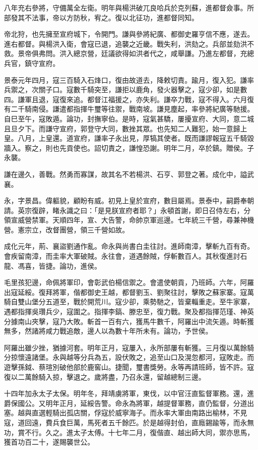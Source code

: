 \begin{pinyinscope}
八年充右參將，守備萬全左衛。明年與楊洪破兀良哈兵於克列蘇，進都督僉事。所部發其不法事，帝以方防秋，宥之。復以北征功，進都督同知。

帝北狩，也先擁至宣府城下，令開門。謙與參將紀廣、都御史羅亨信不應，遂去。進右都督。與楊洪入衛，會寇已退，追襲之近畿。戰失利，洪劾之。兵部並劾洪不救。景帝俱弗問。洪入總京營，廷議欲得如洪者代之，咸舉謙。乃進左都督，充總兵官，鎮守宣府。

景泰元年四月，寇三百騎入石烽口，復由故道去，降敕切責。踰月，復入犯。謙率兵禦之，次關子口。寇數千騎突至，謙拒以鹿角，發火器擊之，寇少卻，如是數四。謙軍且退，寇復來追。都督江福援之，亦失利。謙卒力戰，寇不得入。六月復有二千騎南侵。謙遣都指揮牛璽等往禦，戰南坡。謙見塵起，率參將紀廣等馳援。自巳至午，寇敗遁。論功，封撫寧伯。是時，寇氣甚驕，屢擾宣府、大同，意二城且旦夕下。而謙守宣府，郭登守大同，數挫其眾。也先知二人難犯，始一意歸上皇。八月，上皇還。道宣府，謙率子永出見，厚犒其使者。既而謙謬報寇五千騎毀牆入。察之，則也先貢使也。詔切責之，謙惶恐謝。明年二月，卒於鎮。贈侯。子永襲。

謙在邊久，善戰。然勇而寡謀，故其名不若楊洪、石亨、郭登之著。成化中，謚武襄。

永，字景昌。偉軀貌，顧盼有威。初見上皇於宣府，數目屬焉。景泰中，嗣爵奉朝請。英宗復辟，睹永識之曰：「是見朕宣府者耶？」永頓首謝，即日召侍左右，分領宣威營禁軍。天順四年，宣、大告警，命帥京軍巡邊。七年統三千營，尋兼神機營。憲宗立，改督團營，領三千營如故。

成化元年，荊、襄盜劉通作亂。命永與尚書白圭往討。進師南漳，擊斬九百有奇。會疾留南漳，而圭率大軍破賊。永往會，道遇餘賊，俘斬數百人。其秋復進討石龍、馮喜，皆捷。論功，進侯。

毛里孩犯邊，命佩將軍印，會彰武伯楊信禦之。會遣使朝貢，乃班師。六年，阿羅出寇延綏。復拜將軍，偕都御史王越，都督劉玉、劉聚往討，擊敗之蘇家寨。寇萬騎自雙山堡分五道至，戰於開荒川。寇少卻，乘勢馳之，皆棄輜重走。至牛家寨，遇都指揮吳瓚兵少，寇圍之。指揮李鎬、滕忠至，復力戰。聚及都指揮范瑾、神英分據南山夾擊，寇乃大敗。斬首一百有六，獲馬牛數千，阿羅出中流矢遁。時斬獲無多，然諸將咸力戰追敵，邊人以為數十年所未有。論功，予世侯。

阿羅出雖少挫，猶據河套。明年正月，寇屢入，永所部屢有斬獲。三月復以萬餘騎分掠懷遠諸堡。永與越等分兵為五，設伏敗之，追至山口及滉忽都河，寇敗走。而遊擊孫鉞、蔡瑄別破他部於鹿窖山。捷聞，璽書獎勞。永等再請班師，皆不許。寇復以二萬餘騎入掠，擊退之。歲將盡，乃召永還，留越總制三邊。

十四年加永太子太保。明年冬，拜靖虜將軍，東伐，以中官汪直監督軍務。還，進爵保國公。又明年正月，延綏告警。命永為將軍，越提督軍務，直仍監督，分道出塞。越與直選輕騎出孤店關，俘寇於威寧海子。而永率大軍由南路出榆林，不見寇，道回遠，費兵食巨萬，馬死者五千餘匹。於是越得封伯，直廕錫踰等，而永無功，賞不行。久之。進太子太傅。十七年二月，復偕直、越出師大同，禦亦思馬，獲首功百二十，遂賜襲世公。


\end{pinyinscope}
